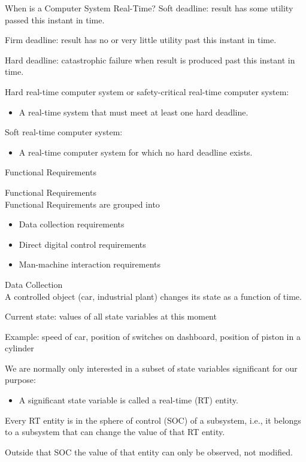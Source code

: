 \begin{frame}{When is a Computer System Real-Time?}
Soft deadline: result has some utility passed this instant in time.

Firm deadline: result has no or very little utility past this instant in
time.

Hard deadline: catastrophic failure when result is produced past this
instant in time.

Hard real-time computer system or safety-critical real-time computer
system:
\begin{itemize}
\item  A real-time system that must meet at least one hard deadline.
\end{itemize}

Soft real-time computer system:

\begin{itemize}
\item  A real-time computer system for which no hard deadline exists.
\end{itemize}

\end{frame}

\begin{frame}{Functional Requirements}

Functional Requirements\\

Functional Requirements are grouped into

\begin{itemize}
\item
  Data collection requirements
\item
  Direct digital control requirements
\item
  Man-machine interaction requirements

\end{itemize}

Data Collection\\

A controlled object (car, industrial plant) changes its state as a
function of time.

Current state: values of all state variables at this moment

Example: speed of car, position of switches on dashboard, position of
piston in a cylinder

We are normally only interested in a subset of state variables
significant for our purpose:

\begin{itemize}
\item  A significant state variable is called a real-time (RT) entity.
\end{itemize}

Every RT entity is in the sphere of control (SOC) of a subsystem, i.e.,
it belongs to a subsystem that can change the value of that RT entity.

Outside that SOC the value of that entity can only be observed, not
modified.

\end{frame}

